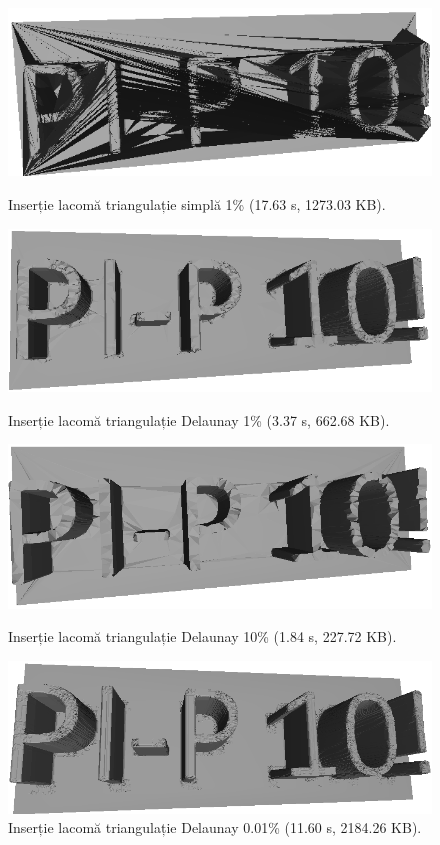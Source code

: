 \documentclass[12pt]{article}
\begin{document}
\begin{figure}[!htb]
	\begin{minipage}{0.24\textwidth}
		\centering
		\includegraphics[width=.95\linewidth]{Text/TextGreedy.png}
		\caption{Inserție lacomă triangulație simplă 1\% (17.63 s, 1273.03 KB).}\label{fig:fig25}
	\end{minipage}\hfill
        \begin{minipage}{0.24\textwidth}
		\centering
		\includegraphics[width=.95\linewidth]{Text/TextDelaunay1.png}
		\caption{Inserție lacomă triangulație Delaunay 1\% (3.37 s, 662.68 KB).}\label{fig:fig26}
	\end{minipage}\hfill
        \begin{minipage}{0.24\textwidth}
		\centering
		\includegraphics[width=.95\linewidth]{Text/TextDelaunay10.png}
		\caption{Inserție lacomă triangulație Delaunay 10\% (1.84 s, 227.72 KB).}\label{fig:fig27}
	\end{minipage}\hfill
        \begin{minipage}{0.24\textwidth}
		\centering
		\includegraphics[width=.95\linewidth]{Text/TextDelaunay001.png}
		\caption{Inserție lacomă triangulație Delaunay 0.01\% (11.60 s, 2184.26 KB).}\label{fig:fig28}
	\end{minipage}\hfill
\end{figure}
\end{document}
